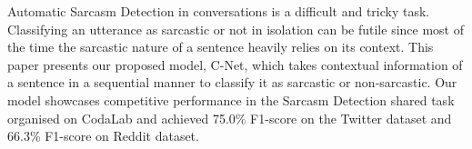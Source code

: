 Automatic Sarcasm Detection in conversations is a difficult and tricky task. Classifying an utterance as sarcastic or not in isolation can be futile since most of the time the sarcastic nature of a sentence heavily relies on its context. This paper presents our proposed model, C-Net, which takes contextual information of a sentence in a sequential manner to classify it as sarcastic or non-sarcastic. Our model showcases competitive performance in the Sarcasm Detection shared task organised on CodaLab and achieved 75.0\% F1-score on the Twitter dataset and 66.3\% F1-score on Reddit dataset.
